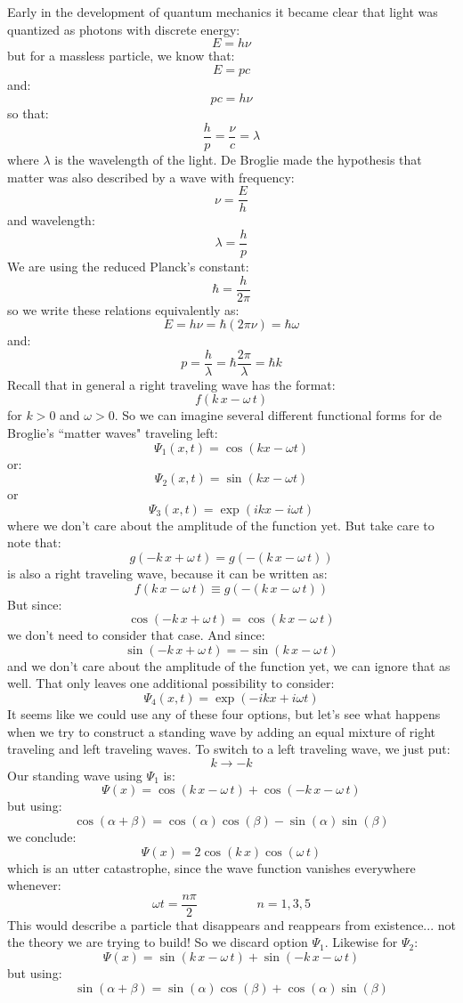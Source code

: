 \documentclass[12pt]{book}
\begin{document}
Early in the development of quantum mechanics it became clear that light was quantized as photons with discrete energy:
$$E=h\nu$$
but for a massless particle, we know that:
$$E = pc$$
and:
$$pc = h\nu$$ 
so that:
$$\frac{h}{p} = \frac{\nu}{c} = \lambda$$
where $\lambda$ is the wavelength of the light.  De Broglie made the hypothesis that matter was also described by a wave with frequency:
$$\nu = \frac{E}{h}$$
and wavelength:
$$\lambda = \frac{h}{p}$$
We are using the reduced Planck's constant:
$$\hbar = \frac{h}{2\pi}$$
so we write these relations equivalently as:
$$E = h\nu = \hbar (2\pi \nu) = \hbar \omega$$
and:
$$p = \frac{h}{\lambda} = \hbar \frac{2\pi}{\lambda} = \hbar k$$
Recall that in general a right traveling wave has the format:
$$f(k\,x-\omega \, t)$$
for $k>0$ and $\omega>0$.  So we can imagine several different functional forms for de Broglie's ``matter waves" traveling left:
$$\Psi_1(x,t) = \cos(kx - \omega t)$$
or:
$$\Psi_2(x,t) = \sin(kx - \omega t)$$
or
$$\Psi_3(x,t) = \exp(ikx - i\omega t)$$
where we don't care about the amplitude of the function yet.  But take care to note that:
$$g(-k\,x+\omega \, t) = g(-(k\,x-\omega \, t))$$
is also a right traveling wave, because it can be written as:
$$f(k\,x-\omega \, t) \equiv g(-(k\,x-\omega \, t))$$
But since:
$$\cos(-k\,x+\omega \, t) = \cos(k\,x-\omega \, t)$$
we don't need to consider that case.  And since:
$$\sin(-k\,x+\omega \, t) = -\sin(k\,x-\omega \, t)$$
and we don't care about the amplitude of the function yet, we can ignore that as well.  That only leaves one additional possibility to consider:
$$\Psi_4(x,t) = \exp(-ikx + i\omega t)$$
It seems like we could use any of these four options, but let's see what happens when we try to construct a standing wave by adding an equal mixture of right traveling and left traveling waves.  To switch to a left traveling wave, we just put:
$$k \to -k$$
Our standing wave using $\Psi_1$ is:
$$\Psi(x) = \cos(k\,x-\omega \, t) + \cos(-k\,x-\omega \, t)$$
but using:
$$\cos(\alpha + \beta) = \cos(\alpha)\cos(\beta) - \sin(\alpha)\sin(\beta)$$
we conclude:
$$\Psi(x) = 2 \cos(k\,x) \cos(\omega \, t)$$
which is an utter catastrophe, since the wave function vanishes everywhere whenever:
$$\omega t = \frac{n \pi}{2} \hspace{2cm} n=1,3,5$$
This would describe a particle that disappears and reappears from existence... not the theory we are trying to build!  So we discard option $\Psi_1$. Likewise for $\Psi_2$:
$$\Psi(x) = \sin(k\,x-\omega \, t) + \sin(-k\,x-\omega \, t)$$
but using:
$$\sin(\alpha + \beta) = \sin(\alpha)\cos(\beta) + \cos(\alpha)\sin(\beta)$$
\end{document}
